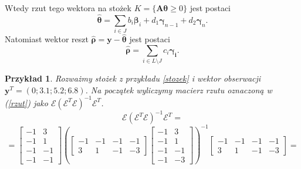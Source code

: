 \documentclass[12pt]{mwart}
\newtheorem{prz}{Przykład}
\begin{document}
Wtedy rzut tego wektora na stożek 
$
K=\{\mathbf{A}\pmb{\theta} \geq 0\}
$
jest postaci
\begin{displaymath}
\hat{\pmb{\theta}}=\sum_{i\in J}{b_i\pmb{\beta}_i}+d_1\pmb{\gamma}_{n-1}+d_2\pmb{\gamma}_n.
\end{displaymath}
Natomiast wektor reszt $\hat{\pmb{\rho}}=\mathbf{y}-\hat{\pmb{\theta}}$ jest postaci
\begin{displaymath}
\hat{\pmb{\rho}}=\sum_{i\in L\setminus J}{c_i\pmb{\gamma_i}}.
\end{displaymath}
\begin{prz}\label{stozek1}
Rozważmy stożek z przykładu \ref{stozek} i wektor obserwacji $\pmb{y}^T=(0;3.1;5.2;6.8)$. 
Na początek wyliczymy macierz rzutu oznaczoną w (\ref{rzut}) jako $\mathcal{E}(\mathcal{E}^T\mathcal{E})^{-1}\mathcal{E}^T$.
$$
\mathcal{E}(\mathcal{E}^T\mathcal{E})^{-1}\mathcal{E}^T=
$$
$$
=\left[\begin{array}{cc}-1&3\\-1&1\\-1&-1\\-1&-1\end{array}\right] \left(\left[\begin{array}{cccc}-1&-1&-1&-1\\3&1&-1&-3\end{array}\right]\left[\begin{array}{cc}-1&3\\-1&1\\-1&-1\\-1&-3\end{array}\right]\right)^{-1}\left[\begin{array}{cccc}-1&-1&-1&-1\\3&1&-1&-3\end{array}\right]=
$$


\end{prz}
\end{document}
